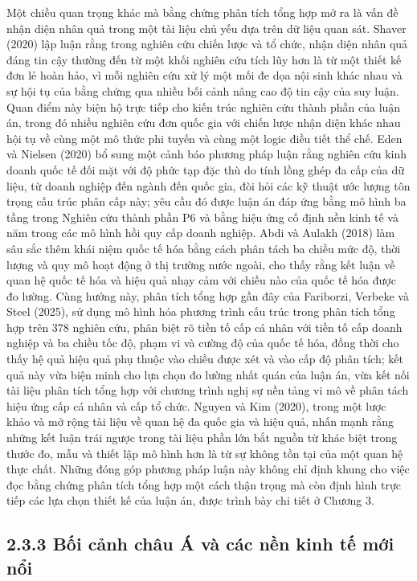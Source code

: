 \documentclass[
  a4paper,
  13pt]{extreport}
\begin{document}
Một chiều quan trọng khác mà bằng chứng phân tích tổng hợp mở ra là vấn
đề nhận diện nhân quả trong một tài liệu chủ yếu dựa trên dữ liệu quan
sát. Shaver (2020) lập luận rằng trong nghiên cứu chiến lược và tổ chức,
nhận diện nhân quả đáng tin cậy thường đến từ một khối nghiên cứu tích
lũy hơn là từ một thiết kế đơn lẻ hoàn hảo, vì mỗi nghiên cứu xử lý một
mối đe dọa nội sinh khác nhau và sự hội tụ của bằng chứng qua nhiều bối
cảnh nâng cao độ tin cậy của suy luận. Quan điểm này biện hộ trực tiếp
cho kiến trúc nghiên cứu thành phần của luận án, trong đó nhiều nghiên
cứu đơn quốc gia với chiến lược nhận diện khác nhau hội tụ về cùng một
mô thức phi tuyến và cùng một logic điều tiết thể chế. Eden và Nielsen
(2020) bổ sung một cảnh báo phương pháp luận rằng nghiên cứu kinh doanh
quốc tế đối mặt với độ phức tạp đặc thù do tính lồng ghép đa cấp của dữ
liệu, từ doanh nghiệp đến ngành đến quốc gia, đòi hỏi các kỹ thuật ước
lượng tôn trọng cấu trúc phân cấp này; yêu cầu đó được luận án đáp ứng
bằng mô hình ba tầng trong Nghiên cứu thành phần P6 và bằng hiệu ứng cố
định nền kinh tế và năm trong các mô hình hồi quy cấp doanh nghiệp. Abdi
và Aulakh (2018) làm sâu sắc thêm khái niệm quốc tế hóa bằng cách phân
tách ba chiều mức độ, thời lượng và quy mô hoạt động ở thị trường nước
ngoài, cho thấy rằng kết luận về quan hệ quốc tế hóa và hiệu quả nhạy
cảm với chiều nào của quốc tế hóa được đo lường. Cùng hướng này, phân
tích tổng hợp gần đây của Fariborzi, Verbeke và Steel (2025), sử dụng mô
hình hóa phương trình cấu trúc trong phân tích tổng hợp trên 378 nghiên
cứu, phân biệt rõ tiền tố cấp cá nhân với tiền tố cấp doanh nghiệp và ba
chiều tốc độ, phạm vi và cường độ của quốc tế hóa, đồng thời cho thấy hệ
quả hiệu quả phụ thuộc vào chiều được xét và vào cấp độ phân tích; kết
quả này vừa biện minh cho lựa chọn đo lường nhất quán của luận án, vừa
kết nối tài liệu phân tích tổng hợp với chương trình nghị sự nền tảng vi
mô về phân tách hiệu ứng cấp cá nhân và cấp tổ chức. Nguyen và Kim
(2020), trong một lược khảo và mở rộng tài liệu về quan hệ đa quốc gia
và hiệu quả, nhấn mạnh rằng những kết luận trái ngược trong tài liệu
phần lớn bắt nguồn từ khác biệt trong thước đo, mẫu và thiết lập mô hình
hơn là từ sự không tồn tại của một quan hệ thực chất. Những đóng góp
phương pháp luận này không chỉ định khung cho việc đọc bằng chứng phân
tích tổng hợp một cách thận trọng mà còn định hình trực tiếp các lựa
chọn thiết kế của luận án, được trình bày chi tiết ở Chương 3.

\hypertarget{bux1ed1i-cux1ea3nh-chuxe2u-uxe1-vuxe0-cuxe1c-nux1ec1n-kinh-tux1ebf-mux1edbi-nux1ed5i}{%
\subsection{2.3.3 Bối cảnh châu Á và các nền kinh tế mới
nổi}\label{bux1ed1i-cux1ea3nh-chuxe2u-uxe1-vuxe0-cuxe1c-nux1ec1n-kinh-tux1ebf-mux1edbi-nux1ed5i}}
\end{document}
